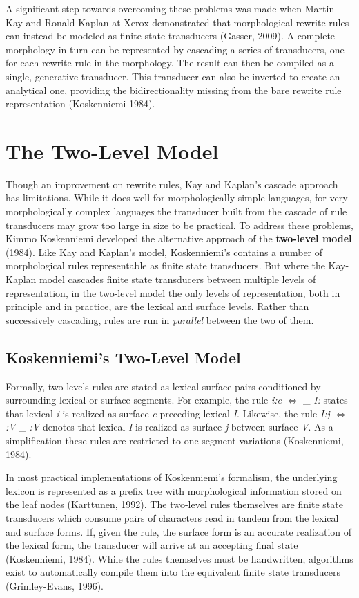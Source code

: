 \documentclass[12pt]{article}
\begin{document}
A significant step towards overcoming these problems was made when Martin Kay and Ronald Kaplan at Xerox demonstrated that morphological rewrite rules can instead be modeled as finite state transducers (Gasser, 2009). A complete morphology in turn can be represented by cascading a series of transducers, one for each rewrite rule in the morphology. The result can then be compiled as a single, generative transducer. This transducer can also be inverted to create an analytical one, providing the bidirectionality missing from the bare rewrite rule representation (Koskenniemi 1984).

\section{The Two-Level Model}
Though an improvement on rewrite rules, Kay and Kaplan's cascade approach has limitations. While it does well for morphologically simple languages, for very morphologically complex languages the transducer built from the cascade of rule transducers may grow too large in size to be practical. To address these problems, Kimmo Koskenniemi developed the alternative approach of the \textbf{two-level model} (1984). Like Kay and Kaplan's model, Koskenniemi's contains a number of morphological rules representable as finite state transducers. But where the Kay-Kaplan model cascades finite state transducers between multiple levels of representation, in the two-level model the only levels of representation, both in principle and in practice, are the lexical and surface levels. Rather than successively cascading, rules are run in \emph{parallel} between the two of them.

\subsection{Koskenniemi's Two-Level Model}
Formally, two-levels rules are stated as lexical-surface pairs conditioned by surrounding lexical or surface segments. For example, the rule \textit{i:e} $\Leftrightarrow$ \_ \textit{I:} states that lexical \textit{i} is realized as surface \textit{e} preceding lexical \textit{I}. Likewise, the rule \textit{I:j} $\Leftrightarrow$ \textit{:V} \_ \textit{:V} denotes that lexical \textit{I} is realized as surface \textit{j} between surface \textit{V}. As a simplification these rules are restricted to one segment variations (Koskenniemi, 1984).

In most practical implementations of Koskenniemi's formalism, the underlying lexicon is represented as a prefix tree with morphological information stored on the leaf nodes (Karttunen, 1992). The two-level rules themselves are finite state transducers which consume pairs of characters read in tandem from the lexical and surface forms. If, given the rule, the surface form is an accurate realization of the lexical form, the transducer will arrive at an accepting final state (Koskenniemi, 1984). While the rules themselves must be handwritten, algorithms exist to automatically compile them into the equivalent finite state transducers (Grimley-Evans, 1996).
\end{document}
